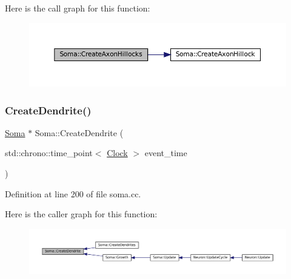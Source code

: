 Here is the call graph for this function\+:\nopagebreak
\begin{figure}[H]
\begin{center}
\leavevmode
\includegraphics[width=350pt]{class_soma_ab059a6d4a7dc41664d6d17794d09b260_cgraph}
\end{center}
\end{figure}
\mbox{\label{class_soma_a0fab0c7cf54c2b7d36e90edcd3e21a16}} 
\subsubsection{\texorpdfstring{Create\+Dendrite()}{CreateDendrite()}}
{\footnotesize\ttfamily \mbox{\hyperlink{class_soma}{Soma}} $\ast$ Soma\+::\+Create\+Dendrite (\begin{DoxyParamCaption}\item[{std\+::chrono\+::time\+\_\+point$<$ \mbox{\hyperlink{universe_8h_a0ef8d951d1ca5ab3cfaf7ab4c7a6fd80}{Clock}} $>$}]{event\+\_\+time }\end{DoxyParamCaption})}



Definition at line 200 of file soma.\+cc.

Here is the caller graph for this function\+:\nopagebreak
\begin{figure}[H]
\begin{center}
\leavevmode
\includegraphics[width=350pt]{class_soma_a0fab0c7cf54c2b7d36e90edcd3e21a16_icgraph}
\end{center}
\end{figure}
\mbox{\label{class_soma_a68dc02eff2912ad045900ab1879f020e}} 
